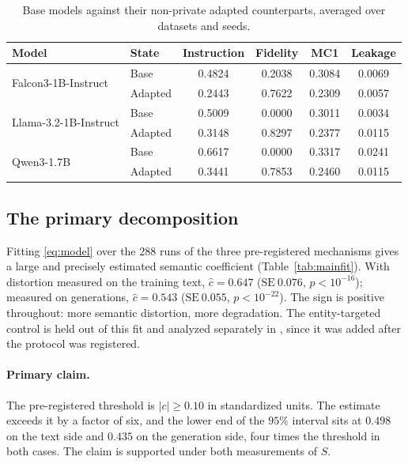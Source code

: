 \begin{table}[t]
  \centering
  \caption{Base models against their non-private adapted counterparts,
  averaged over datasets and seeds.}
  \label{tab:basevsm0}
  \begin{tabular}{llcccc}
    \toprule
    Model & State & Instruction & Fidelity & MC1 & Leakage \\
    \midrule
    \multirow{2}{*}{Falcon3-1B-Instruct}
      & Base     & 0.4824 & 0.2038 & 0.3084 & 0.0069 \\
      & Adapted  & 0.2443 & 0.7622 & 0.2309 & 0.0057 \\
    \multirow{2}{*}{Llama-3.2-1B-Instruct}
      & Base     & 0.5009 & 0.0000 & 0.3011 & 0.0034 \\
      & Adapted  & 0.3148 & 0.8297 & 0.2377 & 0.0115 \\
    \multirow{2}{*}{Qwen3-1.7B}
      & Base     & 0.6617 & 0.0000 & 0.3317 & 0.0241 \\
      & Adapted  & 0.3441 & 0.7853 & 0.2460 & 0.0115 \\
    \bottomrule
  \end{tabular}
\end{table}

\subsection{\label{apx:primary}The primary decomposition}
Fitting \eqref{eq:model} over the $288$ runs of the three pre-registered mechanisms gives a large and precisely estimated semantic coefficient (Table~\ref{tab:mainfit}).
With distortion measured on the training text,
$\hat c = 0.647$ ($\mathrm{SE}\ 0.076$, $p < 10^{-16}$);
measured on generations,
$\hat c = 0.543$ ($\mathrm{SE}\ 0.055$, $p < 10^{-22}$).
The sign is positive throughout:
more semantic distortion,
more degradation.
The entity-targeted control is held out of this fit and analyzed separately in ,
since it was added after the protocol was registered.

\paragraph{Primary claim.}
The pre-registered threshold is $|c| \ge 0.10$ in standardized units.
The estimate exceeds it by a factor of six,
and the lower end of the $95\%$ interval sits at $0.498$ on the text side and $0.435$ on the generation side,
four times the threshold in both cases.
The claim is supported under both measurements of $S$.

